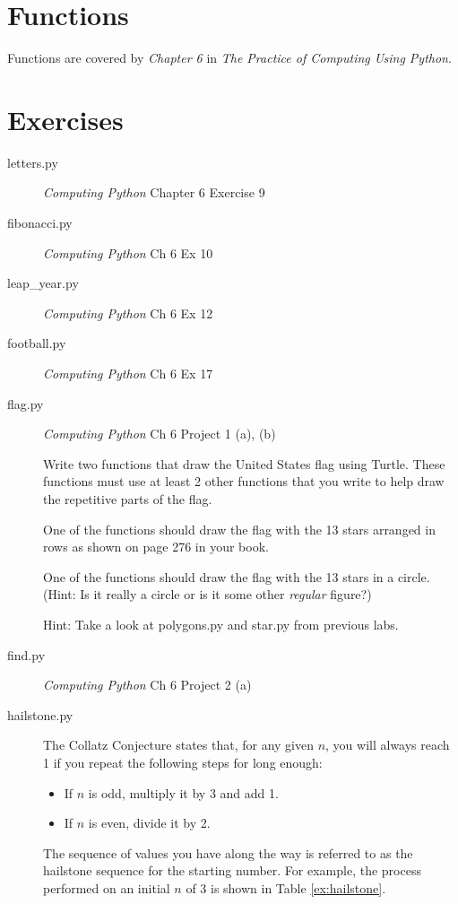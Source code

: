 \documentclass[11pt]{cselabheader}
\begin{document}
\section{Functions}

Functions are covered by \emph{Chapter 6} in \emph{The Practice of Computing
  Using Python}.

\section{Exercises}
\label{sec:ex}

\begin{description}
\item[letters.py] \emph{Computing Python} Chapter 6 Exercise 9

\item[fibonacci.py] \emph{Computing Python} Ch 6 Ex 10

\item[leap\_year.py] \emph{Computing Python} Ch 6 Ex 12

\item[football.py] \emph{Computing Python} Ch 6 Ex 17

\item[flag.py] \emph{Computing Python} Ch 6 Project 1 (a), (b) \hfill

  Write two functions that draw the United States flag using Turtle.
  These functions must use at least 2 other functions that you write
  to help draw the repetitive parts of the flag.

  One of the functions should draw the flag with the 13 stars arranged
  in rows as shown on page 276 in your book.

  One of the functions should draw the flag with the 13 stars in a circle.
  (Hint: Is it really a circle or is it some other \emph{regular} figure?)
  
  Hint: Take a look at polygons.py and star.py from previous labs.

\item[find.py] \emph{Computing Python} Ch 6 Project 2 (a)

\item[hailstone.py] The Collatz Conjecture states that, for any given $n$,
  you will always reach 1 if you repeat the following steps for long enough:
  \begin{itemize}
  \item If $n$ is odd, multiply it by 3 and add 1.
  \item If $n$ is even, divide it by 2.
  \end{itemize}
  The sequence of values you have along the way is referred to as the hailstone
  sequence for the starting number. For example, the process performed on an initial $n$ of 3 is shown in Table \ref{ex:hailstone}.


\end{description}
\end{document}
